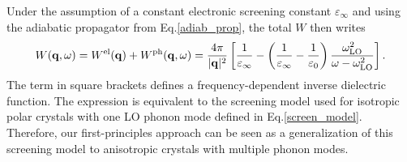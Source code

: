Under the assumption of a constant electronic screening constant $\varepsilon_\infty$ and using the adiabatic propagator from Eq.\;\eqref{adiab_prop}, the total $W$ then writes
%
\begin{equation}\label{w_ph_limit}
    W(\mathbf{q},\omega) = W^\text{el}(\mathbf{q})  + W^\text{ph}(\mathbf{q},\omega) = \frac{4\pi}{|\mathbf{q}|^2}\left[\frac{1}{\varepsilon_\infty} - \left(\frac{1}{\varepsilon_\infty}-\frac{1}{\varepsilon_0}\right)\frac{\omega^2_\text{LO}}{\omega - \omega^2_\text{LO}}\right].
\end{equation}
%
The term in square brackets defines a frequency-dependent inverse dielectric function. The expression is equivalent to the screening model used for isotropic polar crystals with one LO phonon mode defined in Eq.\;\eqref{screen_model}. Therefore, our first-principles approach can be seen as a generalization of this screening model to anisotropic crystals with multiple phonon modes.

